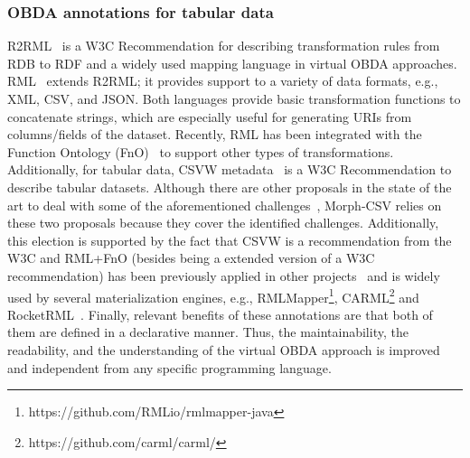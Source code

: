 \subsubsection{OBDA annotations for tabular data}
R2RML~\citep{R2RML} is a W3C Recommendation for describing transformation rules from RDB to RDF and a widely used mapping language in virtual OBDA approaches. RML~\citep{dimou2014rml} extends R2RML; it provides support to a variety of data formats, e.g., XML, CSV, and JSON. Both languages provide basic transformation functions to concatenate strings, which are especially useful for generating URIs from columns/fields of the dataset. Recently, RML has been integrated with the Function Ontology (FnO)~\citep{de2016ontology} to support other types of transformations. Additionally, for tabular data, CSVW metadata~\citep{tennison2015model} is a W3C Recommendation to describe tabular datasets. Although there are other proposals in the state of the art to deal with some of the aforementioned challenges~\citep{junior2016funul,debruyne2016r2rml}, Morph-CSV relies on these two proposals because they cover the identified challenges. Additionally, this election is supported by the fact that CSVW is a recommendation from the W3C and RML+FnO (besides being a extended version of a W3C recommendation) has been previously applied in other projects~\citep{de2017declarative,mami2019squerall} and is widely used by several materialization engines, e.g.,  RMLMapper\footnote{https://github.com/RMLio/rmlmapper-java}, CARML\footnote{https://github.com/carml/carml/} and RocketRML~\citep{csimcsek2019rocketrml}. Finally, relevant benefits of these annotations are that both of them are defined in a declarative manner. Thus, the maintainability, the readability, and the understanding of the virtual OBDA approach is improved and independent from any specific programming language.

